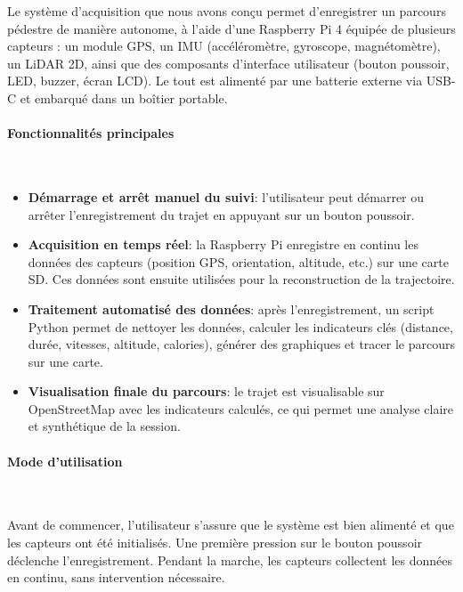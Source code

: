 Le système d’acquisition que nous avons conçu permet d’enregistrer un parcours pédestre de manière autonome, à l’aide d’une Raspberry Pi 4 équipée de plusieurs capteurs : un module GPS, un IMU (accéléromètre, gyroscope, magnétomètre), un LiDAR 2D, ainsi que des composants d’interface utilisateur (bouton poussoir, LED, buzzer, écran LCD). Le tout est alimenté par une batterie externe via USB-C et embarqué dans un boîtier portable.

\paragraph{Fonctionnalités principales}~

\begin{itemize}
    \item \textbf{Démarrage et arrêt manuel du suivi}: l’utilisateur peut démarrer ou arrêter l’enregistrement du trajet en appuyant sur un bouton poussoir. %

    \item \textbf{Acquisition en temps réel}: la Raspberry Pi enregistre en continu les données des capteurs (position GPS, orientation, altitude, etc.) sur une carte SD. Ces données sont ensuite utilisées pour la reconstruction de la trajectoire.


    \item \textbf{Traitement automatisé des données}: après l’enregistrement, un script Python permet de nettoyer les données, calculer les indicateurs clés (distance, durée, vitesses, altitude, calories), générer des graphiques et tracer le parcours sur une carte.

    \item \textbf{Visualisation finale du parcours}: le trajet est visualisable sur OpenStreetMap avec les indicateurs calculés, ce qui permet une analyse claire et synthétique de la session.
\end{itemize}

\paragraph{Mode d’utilisation}~

Avant de commencer, l’utilisateur s’assure que le système est bien alimenté et que les capteurs ont été initialisés. Une première pression sur le bouton poussoir déclenche l’enregistrement.
Pendant la marche, les capteurs collectent les données en continu, sans intervention nécessaire.

